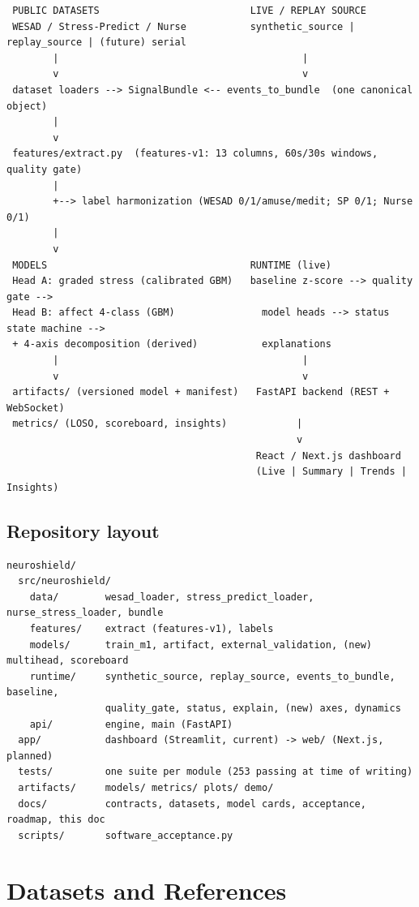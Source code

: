 \documentclass[11pt,a4paper]{article}
\begin{document}
\begin{lstlisting}
 PUBLIC DATASETS                          LIVE / REPLAY SOURCE
 WESAD / Stress-Predict / Nurse           synthetic_source | replay_source | (future) serial
        |                                          |
        v                                          v
 dataset loaders --> SignalBundle <-- events_to_bundle  (one canonical object)
        |
        v
 features/extract.py  (features-v1: 13 columns, 60s/30s windows, quality gate)
        |
        +--> label harmonization (WESAD 0/1/amuse/medit; SP 0/1; Nurse 0/1)
        |
        v
 MODELS                                   RUNTIME (live)
 Head A: graded stress (calibrated GBM)   baseline z-score --> quality gate -->
 Head B: affect 4-class (GBM)               model heads --> status state machine -->
 + 4-axis decomposition (derived)           explanations
        |                                          |
        v                                          v
 artifacts/ (versioned model + manifest)   FastAPI backend (REST + WebSocket)
 metrics/ (LOSO, scoreboard, insights)            |
                                                  v
                                           React / Next.js dashboard
                                           (Live | Summary | Trends | Insights)
\end{lstlisting}

\subsection{Repository layout}
\begin{lstlisting}
neuroshield/
  src/neuroshield/
    data/        wesad_loader, stress_predict_loader, nurse_stress_loader, bundle
    features/    extract (features-v1), labels
    models/      train_m1, artifact, external_validation, (new) multihead, scoreboard
    runtime/     synthetic_source, replay_source, events_to_bundle, baseline,
                 quality_gate, status, explain, (new) axes, dynamics
    api/         engine, main (FastAPI)
  app/           dashboard (Streamlit, current) -> web/ (Next.js, planned)
  tests/         one suite per module (253 passing at time of writing)
  artifacts/     models/ metrics/ plots/ demo/
  docs/          contracts, datasets, model cards, acceptance, roadmap, this doc
  scripts/       software_acceptance.py
\end{lstlisting}

\section{Datasets and References}
\end{document}
